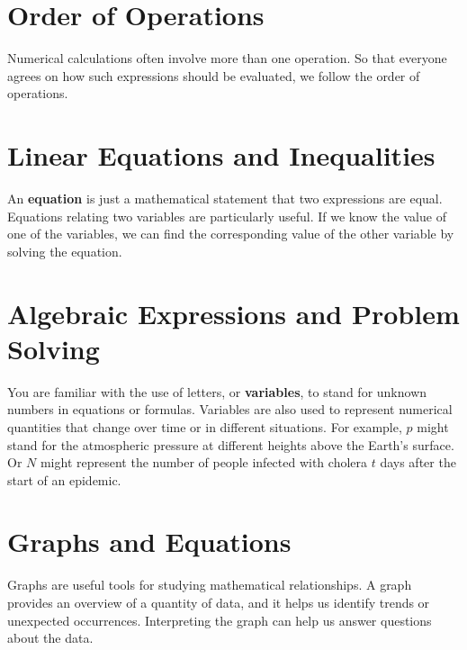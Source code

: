 \documentclass[10pt,]{book}
\newcommand{\terminology}[1]{\textbf{#1}}
\theoremstyle{plain}
\theoremstyle{definition}
\theoremstyle{definition}
\theoremstyle{definition}
\theoremstyle{definition}
\numberwithin{equation}{section}
\begin{document}
\section[Order of Operations]{Order of Operations}\label{Order-of-Operations}
Numerical calculations often involve more than one operation. So that everyone agrees on how such expressions should be evaluated, we follow the order of operations.%
\typeout{************************************************}
\typeout{************************************************}
\section[Linear Equations and Inequalities]{Linear Equations and Inequalities}\label{appendix-Linear-Equations-and-Inequalities}
An \terminology{equation} is just a mathematical statement that two expressions are equal. Equations relating two variables are particularly useful. If we know the value of one of the variables, we can find the corresponding value of the other variable by solving the equation.%
\typeout{************************************************}
\typeout{************************************************}
\section[Algebraic Expressions and Problem Solving]{Algebraic Expressions and Problem Solving}\label{appendix-Algebraic-Expressions-and-Problem-Solving}
You are familiar with the use of letters, or \terminology{variables}, to stand for unknown numbers in equations or formulas. Variables are also used to represent numerical quantities that change over time or in different situations. For example, \(p\) might stand for the atmospheric pressure at different heights above the Earth's surface. Or \(N\) might represent the number of people infected with cholera \(t\) days after the start of an epidemic.%
\typeout{************************************************}
\typeout{************************************************}
\section[Graphs and Equations]{Graphs and Equations}\label{appendix-Graphs-and-Equations}
Graphs are useful tools for studying mathematical relationships. A graph provides an overview of a quantity of data, and it helps us identify trends or unexpected occurrences. Interpreting the graph can help us answer questions about the data.%
\typeout{************************************************}
\typeout{************************************************}
\end{document}
